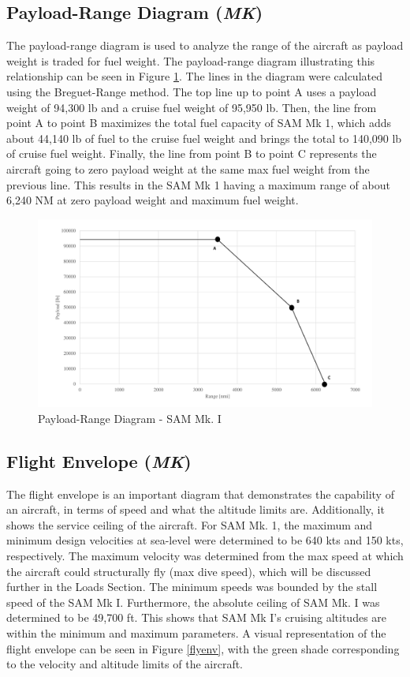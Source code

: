 \subsection{Payload-Range Diagram (\textit{MK})}
The payload-range diagram is used to analyze the range of the aircraft as payload weight is traded for fuel weight. The payload-range diagram illustrating this relationship can be seen in Figure \ref{payrang}. The lines in the diagram were calculated using the Breguet-Range method. The top line up to point A uses a payload weight of 94,300 lb and a cruise fuel weight of 95,950 lb. Then, the line from point A to point B maximizes the total fuel capacity of SAM Mk 1, which adds about 44,140 lb of fuel to the cruise fuel weight and brings the total to 140,090 lb of cruise fuel weight. Finally, the line from point B to point C represents the aircraft going to zero payload weight at the same max fuel weight from the previous line. This results in the SAM Mk 1 having a maximum range of about 6,240 NM at zero payload weight and maximum fuel weight.

\begin{figure}[H]
    \centering
    \includegraphics[width=1.0\textwidth]{Photos/Payload_Range.pdf}
    \caption{Payload-Range Diagram -  SAM Mk. I}
    \label{payrang}
 \end{figure}

\subsection{Flight Envelope (\textit{MK})}
\label{ssfl}
The flight envelope is an important diagram that demonstrates the capability of an aircraft, in terms of speed and what the altitude limits are. Additionally, it shows the service ceiling of the aircraft. For SAM Mk. 1, the maximum and minimum design velocities at sea-level were determined to be 640 kts and 150 kts, respectively. The maximum velocity was determined from the max speed at which the aircraft could structurally fly (max dive speed), which will be discussed further in the Loads Section. The minimum speeds was bounded by the stall speed of the SAM Mk I. Furthermore, the absolute ceiling of SAM Mk. I was determined to be 49,700 ft. This shows that SAM Mk I's cruising altitudes are within the minimum and maximum parameters. A visual representation of the flight envelope can be seen in Figure \ref{flyenv}, with the green shade corresponding to the velocity and altitude limits of the aircraft. 

